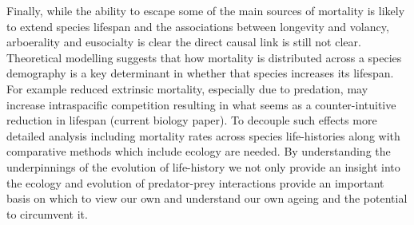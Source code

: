 Finally, while the ability to escape some of the main sources of mortality is likely to extend species lifespan and the associations between longevity and volancy, arboerality and eusocialty is clear the direct causal link is still not clear. Theoretical modelling suggests that how mortality is distributed across a species demography is a key determinant in whether that species increases its lifespan. For example reduced extrinsic mortality, especially due to predation, may increase intraspacific competition resulting in what seems as a counter-intuitive reduction in lifespan (current biology paper). To decouple such effects more detailed analysis including mortality rates across species life-histories along with comparative methods which include ecology are needed. By understanding the underpinnings of the evolution of life-history we not only provide an insight into the ecology and evolution of predator-prey interactions provide an important basis on which to view our own and understand our own ageing and  the potential to circumvent it.









